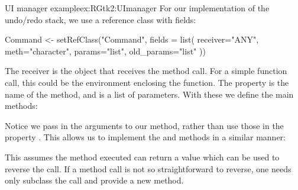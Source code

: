 \begin{example}{UI manager example}{ex:RGtk2:UImanager}
For our implementation of the undo/redo stack, we use a reference
class with fields:
\begin{Schunk}
\begin{Sinput}
 Command <- setRefClass("Command",
                        fields = list(
                          receiver="ANY",
                          meth="character",
                          params="list",
                          old_params="list"
                          ))
\end{Sinput}
\end{Schunk}
%
The receiver is the object that receives the method call. For a simple
function call, this could be the environment enclosing the
function. The  property is the name of the method, and
 is a list of parameters. With these we define the main
methods:
\begin{Schunk}
\end{Schunk}
%

Notice we pass in the arguments to our  method, rather
than use those in the property . This allows us to implement the
 and  methods in a similar manner:
\begin{Schunk}
\end{Schunk}
%
This assumes the method executed can return a value which can be used
to reverse the call. If a method call is not so straightforward to
reverse, one needs only subclass the  call and provide
a new  method.


\end{example}
